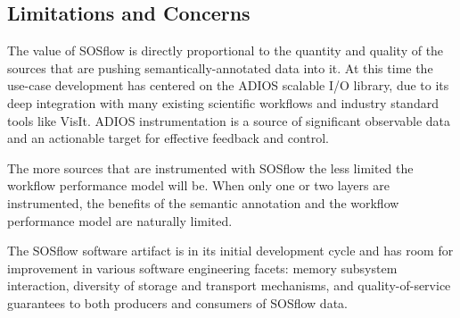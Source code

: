 \subsection{Limitations and Concerns}
The value of SOSflow is directly proportional to the quantity and
quality of the sources that are pushing semantically-annotated data
into it. At this time the use-case development has centered on the
ADIOS scalable I/O library, due to its deep integration with many
existing scientific workflows and industry standard tools like
VisIt. ADIOS instrumentation is a source of significant observable
data and an actionable target for effective feedback and control.

The more sources that are instrumented with SOSflow the less limited
the workflow performance model will be. When only one or two layers
are instrumented, the benefits of the semantic annotation and the
workflow performance model are naturally limited.

The SOSflow software artifact is in its initial development cycle and
has room for improvement in various software engineering facets:
memory subsystem interaction, diversity of storage and transport
mechanisms, and quality-of-service guarantees to both producers and
consumers of SOSflow data.

